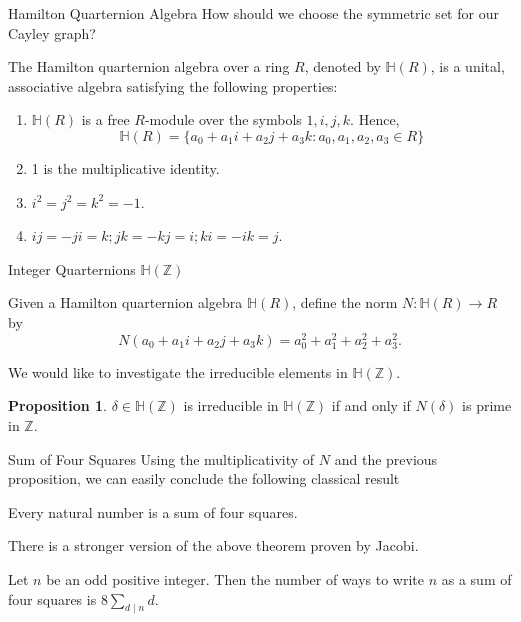 \documentclass[10pt]{beamer}
\theoremstyle{definition}\newtheorem{proposition}{Proposition}
\begin{document}
\begin{frame}{Hamilton Quarternion Algebra}
How should we choose the symmetric set for our Cayley graph?\pause

\begin{definition}
The Hamilton quarternion algebra over a ring $R$, denoted by $\mathbb{H}(R)$, is a unital, associative algebra satisfying the following properties:
\begin{enumerate}
\item $\mathbb{H}(R)$ is a free $R$-module over the symbols $1, i, j, k$. Hence, 
\[\mathbb{H}(R) = \{a_0 + a_1i + a_2j + a_3k : a_0, a_1, a_2, a_3 \in R\}\]
\item 1 is the multiplicative identity.
\item $i^2 = j^2 = k^2 = -1$.
\item $ij = -ji = k; jk = -kj = i; ki = -ik = j$. 
\end{enumerate}
\end{definition}
\end{frame}

\begin{frame}{Integer Quarternions $\mathbb{H}(\mathbb{Z})$}

Given a Hamilton quarternion algebra $\mathbb{H}(R)$, define the norm $N : \mathbb{H}(R) \rightarrow R$ by
\[N(a_0 + a_1i + a_2j + a_3k) = a_0^2 + a_1^2 + a_2^2 + a_3^2.\]

We would like to investigate the irreducible elements in $\mathbb{H}(\mathbb{Z})$.\pause

\begin{proposition}
$\delta \in \mathbb{H}(\mathbb{Z})$ is irreducible in $\mathbb{H}(\mathbb{Z})$ if and only if $N(\delta)$ is prime in $\mathbb{Z}$. 
\end{proposition}
\end{frame}

\begin{frame}{Sum of Four Squares}
Using the multiplicativity of $N$ and the previous proposition, we can easily conclude the following classical result
\begin{theorem}
Every natural number is a sum of four squares.
\end{theorem}
\pause
There is a stronger version of the above theorem proven by Jacobi.

\begin{theorem}
Let $n$ be an odd positive integer. Then the number of ways to write $n$ as a sum of four squares is $8\sum_{d \mid n} d$. 
\end{theorem}
\end{frame}
\end{document}
